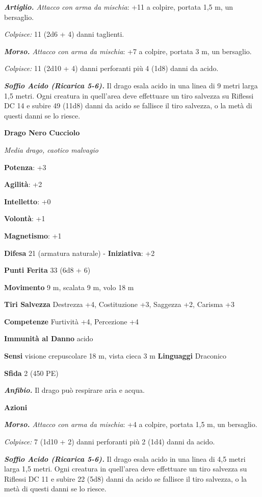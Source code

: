 \begin{multicols}{2}
\emph{\textbf{Artiglio.} Attacco con arma da mischia}: +11 a colpire,
portata 1,5 m, un bersaglio.

\emph{Colpisce:} 11 (2d6 + 4) danni taglienti.

\emph{\textbf{Morso.} Attacco con arma da mischia}: +7 a colpire,
portata 3 m, un bersaglio.

\emph{Colpisce:} 11 (2d10 + 4) danni perforanti più 4 (1d8) danni da
acido.

\emph{\textbf{Soffio Acido (Ricarica 5-6).}} Il drago esala acido in una
linea di 9 metri larga 1,5 metri. Ogni creatura in quell'area deve
effettuare un tiro salvezza su Riflessi DC 14 e subire 49 (11d8) danni
da acido se fallisce il tiro salvezza, o la metà di questi danni se lo
riesce.

\textbf{Drago Nero Cucciolo}

\emph{Media drago, caotico malvagio}

\textbf{Potenza}: +3

\textbf{Agilità}: +2

\textbf{Intelletto}: +0

\textbf{Volontà}: +1

\textbf{Magnetismo}: +1

\textbf{Difesa} 21 (armatura naturale) - \textbf{Iniziativa}: +2

\textbf{Punti Ferita} 33 (6d8 + 6)

\textbf{Movimento} 9 m, scalata 9 m, volo 18 m

\textbf{Tiri Salvezza} Destrezza +4, Costituzione +3, Saggezza +2,
Carisma +3

\textbf{Competenze} Furtività +4, Percezione +4

\textbf{Immunità al Danno} acido

\textbf{Sensi} visione crepuscolare 18 m, vista cieca 3 m
\textbf{Linguaggi} Draconico

\textbf{Sfida} 2 (450 PE)

\emph{\textbf{Anfibio.}} Il drago può respirare aria e acqua.

\textbf{Azioni}

\emph{\textbf{Morso.} Attacco con arma da mischia}: +4 a colpire,
portata 1,5 m, un bersaglio.

\emph{Colpisce:} 7 (1d10 + 2) danni perforanti più 2 (1d4) danni da
acido.

\emph{\textbf{Soffio Acido (Ricarica 5-6).}} Il drago esala acido in una
linea di 4,5 metri larga 1,5 metri. Ogni creatura in quell'area deve
effettuare un tiro salvezza su Riflessi DC 11 e subire 22 (5d8) danni
da acido se fallisce il tiro salvezza, o la metà di questi danni se lo
riesce.


\end{multicols}
